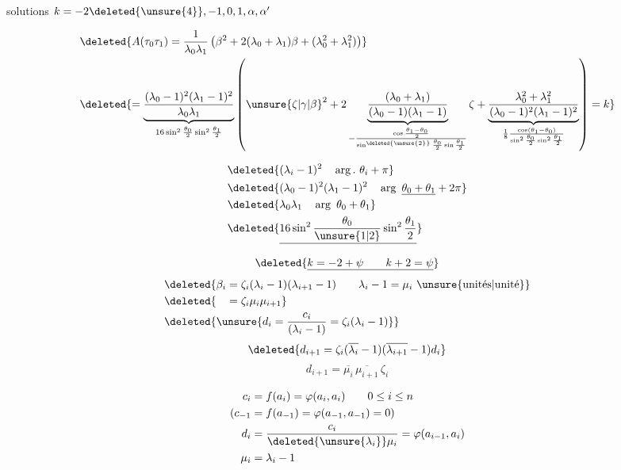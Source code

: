 solutions \qquad $k=-2\deleted{\unsure{4}},-1,0,1,\alpha,\alpha'$

\[
\begin{aligned}
&\deleted{A(\tau_0\tau_1)=\frac1{\lambda_0\lambda_1}
\left(\beta^2+2(\lambda_0+\lambda_1)\beta+(\lambda_0^2+\lambda_1^2)\right)}\\
&\deleted{=\underbrace{\frac{(\lambda_0-1)^2(\lambda_1-1)^2}{\lambda_0\lambda_1}}_{16\sin^2\frac{\theta_0}{2}\sin^2\frac{\theta_1}{2}}
\left({\unsure{\zeta|\gamma|\beta}}^2+2\underbrace{\frac{(\lambda_0+\lambda_1)}{(\lambda_0-1)(\lambda_1-1)}}_{-\frac{\cos\frac{\theta_1-\theta_0}{2}}{\sin^{\deleted{\unsure{2}}}\frac{\theta_0}{2}\sin\frac{\theta_1}{2}}}\zeta
+\underbrace{\frac{\lambda_0^2+\lambda_1^2}{(\lambda_0-1)^2(\lambda_1-1)^2}}_{\frac18\frac{\cos(\theta_1-\theta_0)}{\sin^2\frac{\theta_0}{2}\sin^2\frac{\theta_1}{2}}}\right)=k}
\end{aligned}
\]

\[
\begin{aligned}
&\deleted{(\lambda_i-1)^2\quad\arg.\ \theta_i+\pi}\\
&\deleted{(\lambda_0-1)^2(\lambda_1-1)^2\quad\arg\ \underline{\theta_0+\theta_1}+2\pi}\\
&\deleted{\lambda_0\lambda_1\quad\arg\ \theta_0+\theta_1}\\
&\deleted{\underline{16\sin^2\frac{\theta_0}{\unsure{1|2}}\sin^2\frac{\theta_1}{2}}}
\end{aligned}
\]

\[
\deleted{\underline{k=-2+\psi\qquad k+2=\psi}}
\]
\[
\begin{aligned}
&\deleted{\beta_i=\zeta_i(\lambda_i-1)(\lambda_{i+1}-1)\qquad \lambda_i-1=\mu_i\ \text{\unsure{unités|unité}}}\\
&\deleted{\phantom{\beta_i}=\zeta_i\mu_i\mu_{i+1}}\\
&\deleted{\unsure{d_i=\frac{c_i}{(\lambda_i-1)}=\zeta_i(\lambda_i-1)}}
\end{aligned}
\]
\[
\deleted{d_{i+1}=\zeta_i(\overline{\lambda_i}-1)(\overline{\lambda_{i+1}}-1)d_i}
\]
\[
d_{i+1}=\overline{\mu_i}\,\overline{\mu_{i+1}}\,\zeta_i
\]

\[
\begin{aligned}
c_i&=f(a_i)=\varphi(a_i,a_i)\qquad 0\leq i\leq n\\
(c_{-1}&=f(a_{-1})=\varphi(a_{-1},a_{-1})=0)\\
d_i&=\frac{c_i}{\deleted{\unsure{\lambda_i}}\mu_i}=\varphi(a_{i-1},a_i)\\
\mu_i&=\lambda_i-1
\end{aligned}
\]

